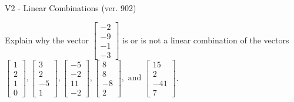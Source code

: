 \begin{exercise}
  \begin{exerciseTitle}V2 - Linear Combinations (ver. 902)\end{exerciseTitle}
  \begin{exerciseStatement}
    Explain why the vector \(\left[\begin{array}{c}
-2 \\
-9 \\
-1 \\
-3
\end{array}\right]\)  is or is not a linear 
	combination of the vectors \(\left[\begin{array}{c}
1 \\
2 \\
1 \\
0
\end{array}\right] , \left[\begin{array}{c}
3 \\
2 \\
-5 \\
1
\end{array}\right] , \left[\begin{array}{c}
-5 \\
-2 \\
11 \\
-2
\end{array}\right] , \left[\begin{array}{c}
8 \\
8 \\
-8 \\
2
\end{array}\right] , \text{ and } \left[\begin{array}{c}
15 \\
2 \\
-41 \\
7
\end{array}\right]\).
	



\end{exerciseStatement}
\end{exercise}

